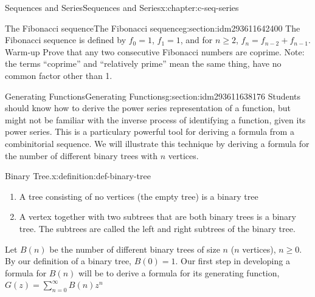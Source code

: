 \documentclass[twoside,10pt,]{book}
\numberwithin{equation}{section}
\begin{document}
%
%
\typeout{************************************************}
\typeout{************************************************}
%
\begin{chapterptx}{Sequences and Series}{}{Sequences and Series}{}{}{x:chapter:c-seq-series}
\begin{introduction}{}%
%
\end{introduction}%
%
%
\typeout{************************************************}
\typeout{************************************************}
%
\begin{sectionptx}{The Fibonacci sequence}{}{The Fibonacci sequence}{}{}{g:section:idm293611642400}
%
The Fibonacci sequence is defined by  \(f_0=1\), \(f_1= 1\), and for \(n\geq 2\), \(f_n= f_{n-2}+f_{n-1}\). Warm-up  Prove that any two consecutive Fibonacci numbers are coprime.  Note:  the terms  ``coprime''  and   ``relatively prime'' mean the same thing, have no common factor other than 1.%
\end{sectionptx}
%
%
\typeout{************************************************}
\typeout{************************************************}
%
\begin{sectionptx}{Generating Functions}{}{Generating Functions}{}{}{g:section:idm293611638176}
%
Students should know how to derive the power series representation of a function, but might not be familiar with the inverse process of identifying  a function, given its power series.   This is a particulary powerful tool for deriving a formula from a combinitorial sequence. We will illustrate this technique by deriving a formula for the number of different binary trees with \(n\) vertices.%
\begin{definition}{Binary Tree.}{x:definition:def-binary-tree}%
%
%
\begin{enumerate}[label=(\arabic*)]
\item{}A tree consisting of no vertices (the empty tree) is a binary tree%
\item{}A vertex together with two subtrees that are both binary trees is a binary tree. The subtrees are called the left and right subtrees of the binary tree.%
\end{enumerate}
%
\end{definition}
Let \(B(n)\) be the number of different binary trees of size \(n\) (\(n\) vertices), \(n \geq  0\). By our definition of a binary tree, \(B(0) = 1\). Our first step in developing a formula for \(B(n)\) will be to derive a formula for its generating function, \(G(z)=\sum_{n=0}^{\infty} B(n)z^n\)%

\end{sectionptx}
\end{chapterptx}
\end{document}
